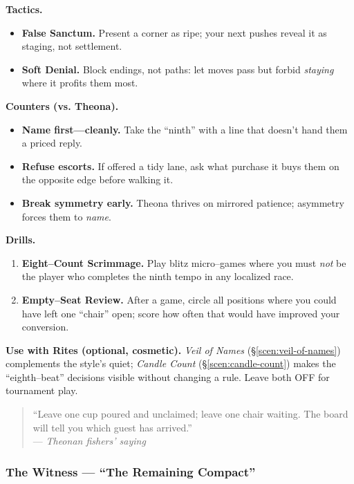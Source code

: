 \documentclass[11pt]{article}
\numberwithin{equation}{section} %
\theoremstyle{plain} %
\theoremstyle{definition} %
\theoremstyle{remark} %
\begin{document}
\medskip
\noindent\textbf{Tactics.}
\begin{itemize}\setlength\itemsep{0.25em}
  \item \textbf{False Sanctum.} Present a corner as ripe; your next pushes reveal it as staging, not settlement.
  \item \textbf{Soft Denial.} Block endings, not paths: let moves pass but forbid \emph{staying} where it profits them most.
\end{itemize}

\medskip
\noindent\textbf{Counters (vs. Theona).}
\begin{itemize}\setlength\itemsep{0.25em}
  \item \textbf{Name first—cleanly.} Take the “ninth” with a line that doesn’t hand them a priced reply.
  \item \textbf{Refuse escorts.} If offered a tidy lane, ask what purchase it buys them on the opposite edge before walking it.
  \item \textbf{Break symmetry early.} Theona thrives on mirrored patience; asymmetry forces them to \emph{name}.
\end{itemize}

\medskip
\noindent\textbf{Drills.}
\begin{enumerate}\setlength\itemsep{0.25em}
  \item \textbf{Eight–Count Scrimmage.} Play blitz micro–games where you must \emph{not} be the player who completes the ninth tempo in any localized race.
  \item \textbf{Empty–Seat Review.} After a game, circle all positions where you could have left one “chair” open; score how often that would have improved your conversion.
\end{enumerate}

\medskip
\noindent\textbf{Use with Rites (optional, cosmetic).} \emph{Veil of Names} (\S\ref{scen:veil-of-names}) complements the style’s quiet; \emph{Candle Count} (\S\ref{scen:candle-count}) makes the “eighth–beat” decisions visible without changing a rule. Leave both \textsc{OFF} for tournament play.

\medskip
\begin{quote}\small
“Leave one cup poured and unclaimed; leave one chair waiting. The board will tell you which guest has arrived.”\\
\hfill — \textit{Theonan fishers’ saying}
\end{quote}

\subsubsection{The Witness — “The Remaining Compact”}
\label{school:witness}
\end{document}
